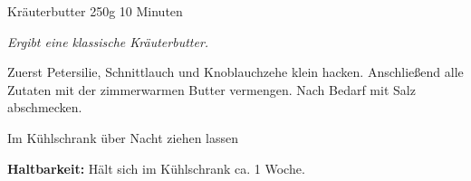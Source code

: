 \begin{recipe}{Kräuterbutter} {250g} {10 Minuten}

\freeform
\textit{Ergibt eine klassische Kräuterbutter.}


Zuerst Petersilie, Schnittlauch und Knoblauchzehe klein hacken.
Anschließend alle Zutaten mit der zimmerwarmen Butter vermengen.
Nach Bedarf mit Salz abschmecken.

\newstep
Im Kühlschrank über Nacht ziehen lassen

\freeform
\hrulefill

\freeform 
\textbf{Haltbarkeit:}
Hält sich im Kühlschrank ca. 1 Woche.

\end{recipe}
